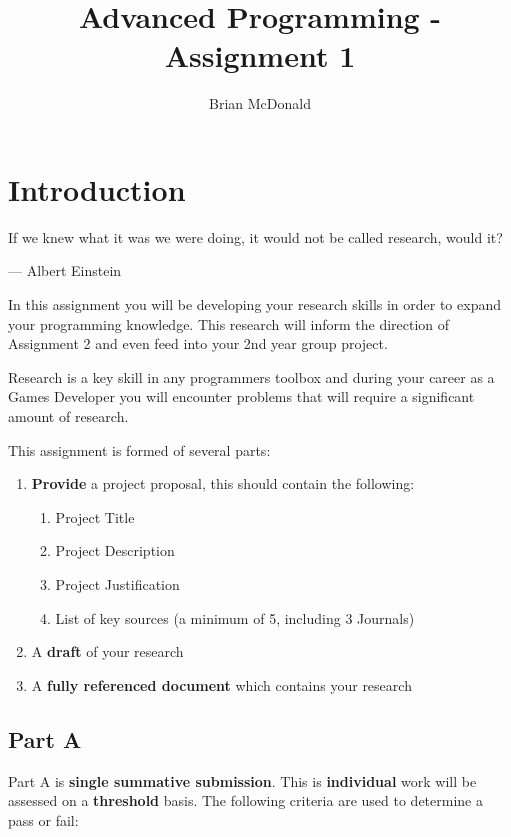 \documentclass{../fal_assignment}
\title{Advanced Programming - Assignment 1}
\author{Brian McDonald}
\begin{document}
\maketitle

\section*{Introduction}

\begin{marginquote}
If we knew what it was we were doing, it would not be called research, would it?

--- Albert Einstein

\end{marginquote}

In this assignment you will be developing your research skills in order to expand your programming knowledge. This research will inform the direction of Assignment 2 and even feed into your 2nd year group project.

Research is a key skill in any programmers toolbox and during your career as a Games Developer you will encounter problems that will require a significant amount of research.

This assignment is formed of several parts:

\begin{enumerate}[label=(\Alph*)]
	\item \textbf{Provide} a project proposal, this should contain the following:
	\begin{enumerate}
		\item Project Title
		\item Project Description
		\item Project Justification
		\item List of key sources  (a minimum of 5, including 3 Journals) 
	\end{enumerate}
    \item A \textbf{draft} of your research
    \item A \textbf{fully referenced document} which contains your research
\end{enumerate}

\subsection*{Part A}

Part A is \textbf{single summative submission}. This is \textbf{individual} work will be assessed on a \textbf{threshold} basis. The following criteria are used to determine a pass or fail: 
\end{document}
